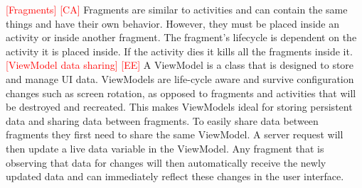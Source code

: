 \documentclass[acmlarge, review=false, screen=true]{acmart}
\begin{document}
    \textcolor{red}{[Fragments] [CA]} \newline
    Fragments are similar to activities and can contain the same things and have their own behavior\cite{fragments}. However, they must be placed inside an activity or inside another fragment. The fragment’s lifecycle is dependent on the activity it is placed inside. If the activity dies it kills all the fragments inside it.
\newline\newline
    \textcolor{red}{[ViewModel data sharing] [EE]} \newline
    A ViewModel is a class that is designed to store and manage UI data\cite{viewmodel}. ViewModels are life-cycle aware and survive configuration changes such as screen rotation, as opposed to fragments and activities that will be destroyed and recreated. This makes ViewModels ideal for storing persistent data and sharing data between fragments. To easily share data between fragments they first need to share the same ViewModel. A server request will then update a live data variable in the ViewModel. Any fragment that is observing that data for changes will then automatically receive the newly updated data and can immediately reflect these changes in the user interface. 
\end{document}
